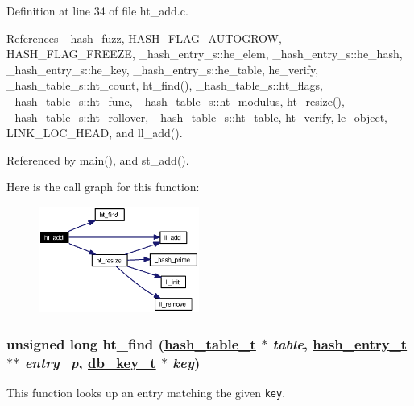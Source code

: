 Definition at line 34 of file ht\_\-add.c.

References \_\-hash\_\-fuzz, HASH\_\-FLAG\_\-AUTOGROW, HASH\_\-FLAG\_\-FREEZE, \_\-hash\_\-entry\_\-s::he\_\-elem, \_\-hash\_\-entry\_\-s::he\_\-hash, \_\-hash\_\-entry\_\-s::he\_\-key, \_\-hash\_\-entry\_\-s::he\_\-table, he\_\-verify, \_\-hash\_\-table\_\-s::ht\_\-count, ht\_\-find(), \_\-hash\_\-table\_\-s::ht\_\-flags, \_\-hash\_\-table\_\-s::ht\_\-func, \_\-hash\_\-table\_\-s::ht\_\-modulus, ht\_\-resize(), \_\-hash\_\-table\_\-s::ht\_\-rollover, \_\-hash\_\-table\_\-s::ht\_\-table, ht\_\-verify, le\_\-object, LINK\_\-LOC\_\-HEAD, and ll\_\-add().

Referenced by main(), and st\_\-add().

Here is the call graph for this function:\begin{figure}[H]
\begin{center}
\leavevmode
\includegraphics[width=149pt]{group__dbprim__hash_ga10_cgraph}
\end{center}
\end{figure}
\hypertarget{group__dbprim__hash_ga13}{
\subsubsection[ht\_\-find]{\setlength{\rightskip}{0pt plus 5cm}unsigned long ht\_\-find (\hyperlink{struct__hash__table__s}{hash\_\-table\_\-t} $\ast$ {\em table}, \hyperlink{struct__hash__entry__s}{hash\_\-entry\_\-t} $\ast$$\ast$ {\em entry\_\-p}, \hyperlink{struct__db__key__s}{db\_\-key\_\-t} $\ast$ {\em key})}}
\label{group__dbprim__hash_ga13}


This function looks up an entry matching the given {\tt key}.

